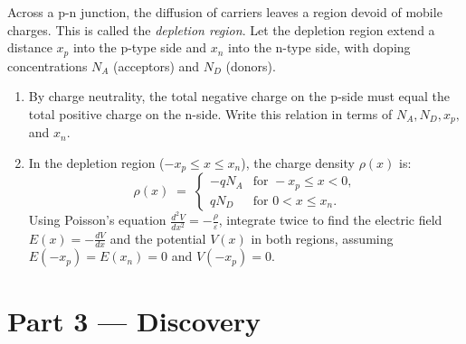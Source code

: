 \documentclass[12pt, a4paper]{book}
\newcommand{\newterm}[1]{\textit{\textcolor{DiscoveryColor}{#1}}}
\begin{document}
\begin{problembox}
Across a p-n junction, the diffusion of carriers leaves a region devoid of mobile charges. This is called the \newterm{depletion region}.
Let the depletion region extend a distance $x_p$ into the p-type side and $x_n$ into the n-type side, with doping concentrations $N_A$ (acceptors) and $N_D$ (donors).

\begin{enumerate}[label=(\alph*)]
  \item By charge neutrality, the total negative charge on the p-side must equal the total positive charge on the n-side. Write this relation in terms of $N_A, N_D, x_p,$ and $x_n$.
  \item In the depletion region ($-x_p \le x \le x_n$), the charge density $\rho(x)$ is:
        \[
          \rho(x) \;=\; \begin{cases}
            -q N_A & \text{for } -x_p \le x < 0, \\
            q N_D  & \text{for } 0 < x \le x_n.
          \end{cases}
        \]
        Using Poisson's equation $\frac{d^2 V}{dx^2} = -\frac{\rho}{\varepsilon}$, integrate twice to find the electric field $E(x) = -\frac{dV}{dx}$ and the potential $V(x)$ in both regions, assuming $E(-x_p) = E(x_n) = 0$ and $V(-x_p) = 0$.
\end{enumerate}
\end{problembox}

\newpage

\section{Part 3 --- Discovery}
\end{document}
